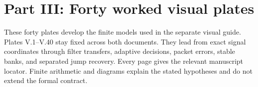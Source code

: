 \documentclass[11pt,letterpaper]{article}
\theoremstyle{plain}
\theoremstyle{plain}
\theoremstyle{plain}
\theoremstyle{definition}
\theoremstyle{definition}
\theoremstyle{definition}
\theoremstyle{definition}
\theoremstyle{remark}
\theoremstyle{remark}
\theoremstyle{remark}
\theoremstyle{remark}
\begin{document}
\clearpage
\part*{Part III: Forty worked visual plates}
\begin{readerroadmap}[title={A second route through the mathematics}]
These forty plates develop the finite models used in the separate visual guide. Plates V.1--V.40 stay fixed across both documents. They lead from exact signal coordinates through filter transfers, adaptive decisions, packet errors, stable banks, and separated jump recovery. Every page gives the relevant manuscript locator. Finite arithmetic and diagrams explain the stated hypotheses and do not extend the formal contract.
\end{readerroadmap}
\clearpage
\begingroup
\setlength{\parskip}{3pt}
\setlength{\abovedisplayskip}{6pt}\setlength{\belowdisplayskip}{6pt}
\fontsize{10}{12}\selectfont

\endgroup
\clearpage



\end{document}
